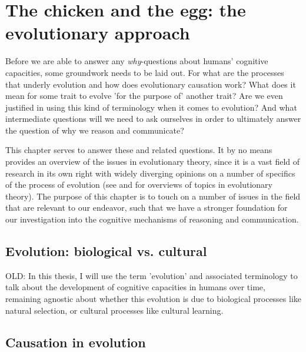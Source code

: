 \chapter{The chicken and the egg: the evolutionary approach}
\label{ch:evolution}

Before we are able to answer any \emph{why}-questions about humans' cognitive capacities, some groundwork needs to be laid out. For what are the processes that underly evolution and how does evolutionary causation work? What does it mean for some trait to evolve 'for the purpose of' another trait? Are we even justified in using this kind of terminology when it comes to evolution? And what intermediate questions will we need to ask ourselves in order to ultimately answer the question of why we reason and communicate?

This chapter serves to answer these and related questions. It by no means provides an overview of the issues in evolutionary theory, since it is a vast field of research in its own right with widely diverging opinions on a number of specifics of the process of evolution (see \citet{Ariew02} and \citet{UllerLaland19} for overviews of topics in evolutionary theory).
The purpose of this chapter is to touch on a number of issues in the field that are relevant to our endeavor, such that we have a stronger foundation for our investigation into the cognitive mechanisms of reasoning and communication.

\section{Evolution: biological vs. cultural}
\label{sec:evo-bio-culture}

OLD: In this thesis, I will use the term 'evolution' and associated terminology to talk about the development of cognitive capacities in humans over time, remaining agnostic about whether this evolution is due to biological processes like natural selection, or cultural processes like cultural learning.

\section{Causation in evolution}
\label{sec:causation-evolution}


